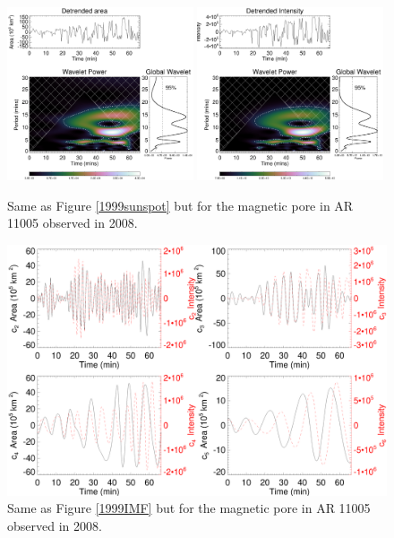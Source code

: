    \begin{figure}
   \centering
   \includegraphics[width=0.49\textwidth]{2008_wl.eps}
   \includegraphics[width=0.49\textwidth]{2008_wl_inten.eps}
   	   \caption{
      			Same as Figure \ref{1999sunspot} but for the magnetic pore in AR 11005 observed in 2008.
 		      }
      \label{2008pore}
   \end{figure}
   
     \begin{figure}
     \centering
     \includegraphics[width=\textwidth]{2008_IMFs.eps}
     \caption{
       			Same as Figure \ref{1999IMF} but for the magnetic pore in AR 11005 observed in 2008.
        		  }
     \label{20008IMF}
     \end{figure}
      
